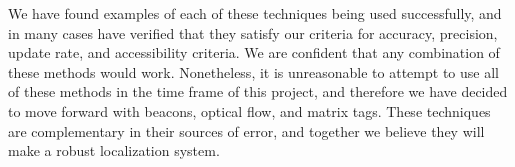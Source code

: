 \documentclass{article}
\begin{document}
We have found examples of each of these techniques being used successfully, and in many cases have verified that they satisfy our criteria for accuracy, precision, update rate, and accessibility criteria. We are confident that any combination of these methods would work. Nonetheless, it is unreasonable to attempt to use all of these methods in the time frame of this project, and therefore we have decided to move forward with beacons, optical flow, and matrix tags. These techniques are complementary in their sources of error, and together we believe they will make a robust localization system.





\end{document}
